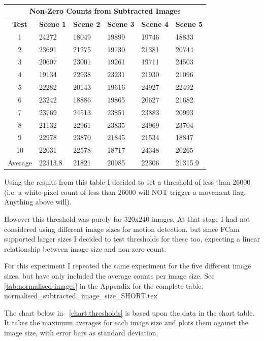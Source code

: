 {{\begin{center}
\begin{table}[!htbp]
\begin{tabular}{| c | l | l | l | l | l | }
\hline
\multicolumn{6}{|c|}{\bf Non-Zero Counts from Subtracted Images} \\
\hline
\bf Test	&\bf Scene 1	&\bf Scene 2	&\bf Scene 3	&\bf Scene 4	&\bf Scene 5	\\ \hline
1	&24272	&18049	&19899	&19746	&18833\\
2	&23691	&21275	&19730	&21381	&20744\\
3	&20607	&23001	&19261	&19711	&24503\\
4	&19134	&22938	&23231	&21930	&21096\\
5	&22282	&20143	&19616	&24927	&22492\\
6	&23242	&18886	&19865	&20627	&21682\\
7	&23769	&24513	&23851	&23883	&20993\\
8	&21132	&22961	&23835	&24969	&23704\\
9	&22978	&23870	&21845	&21534	&18847\\
10	&22031	&22578	&18717	&24348	&20265\\ \hline
Average	&22313.8	&21821	&20985	&22306	&21315.9	\\ \hline
	\end{tabular}
\caption{}
\vspace{-8pt}
\label{tab:sub2}
\end{table}
\vspace{-20pt}
\end{center}
Using the results from this table I decided to set a threshold of less than 26000 (i.e. a white-pixel count of less than 26000 will NOT trigger a movement flag. Anything above will). 

However this threshold was purely for 320x240 images. At that stage I had not considered using different image sizes  for motion detection, but since FCam supported larger sizes I decided to test thresholds for these too, expecting a linear relationship between image size and non-zero count.

For this experiment I repeated the same experiment for the five different image sizes, but have only included the average counts per image size. See \ref{tab:normalised-images} in the Appendix for the complete table.\\

{normalised_subtracted_image_size_SHORT.tex}

The chart below in ~\cref{chart:thresholds} is based upon the data in the short table. It takes the maximum averages for each image size and plots them against the image size, with error bars as standard deviation.\\

}}
